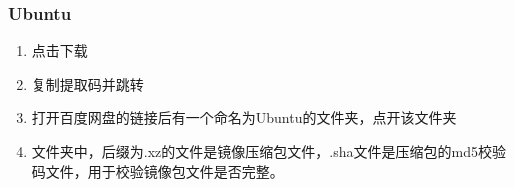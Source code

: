 \subsubsection{Ubuntu}\label{ubuntu}

\begin{enumerate}
\def\labelenumi{\arabic{enumi}.}
\tightlist
\item
  点击下载
\item
  复制提取码并跳转
\item
  打开百度网盘的链接后有一个命名为Ubuntu的文件夹，点开该文件夹
\item
  文件夹中，后缀为.xz的文件是镜像压缩包文件，.sha文件是压缩包的md5校验码文件，用于校验镜像包文件是否完整。

\end{enumerate}
